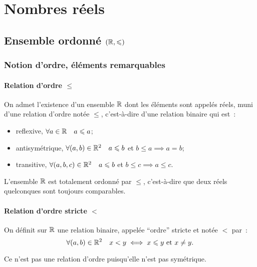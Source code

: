 \chapter{Nombres réels}\label{chap:reels}
\minitoc%
\minilof%
\minilot%
\section{Ensemble ordonné \((\mathbb{R}, \leqslant)\)}

\subsection{Notion d'ordre, éléments remarquables}

\subsubsection{Relation d'ordre \(\leqslant\)}

On admet l'existence d'un ensemble \(\mathbb{R}\) dont les éléments sont appelés réels, 
muni d'une relation d'ordre notée \(\leqslant\), c'est-à-dire d'une relation 
binaire qui est~:
\begin{itemize}
  \item reflexive, \(\forall a \in \mathbb{R} \quad a\leqslant a\);
  \item antisymétrique, \(\forall (a, b) \in \mathbb{R}^2 \quad a\leqslant b\) et \( 
    b\leqslant a \implies a = b\);
  \item transitive, \(\forall (a, b, c) \in \mathbb{R}^2 \quad a\leqslant b\) et 
    \(b\leqslant c \implies a\leqslant c\).
\end{itemize}
L'ensemble \(\mathbb{R}\) est totalement ordonné par \(\leqslant\), c'est-à-dire que 
deux réels quelconques sont toujours comparables.

\subsubsection{Relation d'ordre stricte \(<\)}

\begin{defdef}
  On définit sur \(\mathbb{R}\) une relation binaire, appelée ``ordre'' stricte et notée 
  \(<\) par~:
  \begin{equation}
    \forall (a, b) \in \mathbb{R}^2 \quad x<y \iff x\leqslant y \text{~et~} x\neq y.
  \end{equation}
\end{defdef}
Ce n'est pas une relation d'ordre puisqu'elle n'est pas symétrique.

